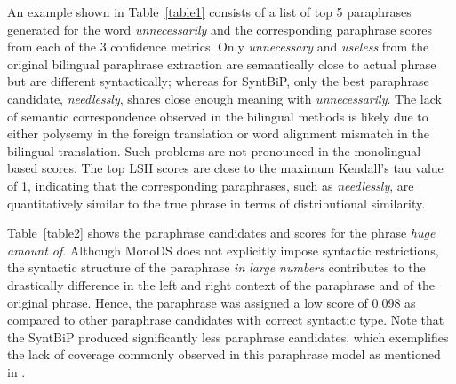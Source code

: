 \documentclass[11pt]{article}
\begin{document}
An example shown in Table~\ref{table1} consists of a list of top 5 paraphrases generated for the word  {\em unnecessarily} and the corresponding paraphrase scores from each of the 3 confidence metrics. Only {\em unnecessary} and {\em useless} from the original bilingual paraphrase extraction are semantically close to actual phrase but are different syntactically; whereas for SyntBiP, only the best paraphrase candidate, {\em needlessly}, shares close enough meaning with {\em unnecessarily}. 
The lack of semantic correspondence observed in the bilingual methods is likely due to either polysemy in the foreign translation or word alignment mismatch in the bilingual translation. Such problems are not pronounced in the monolingual-based scores. The top LSH scores are close to the maximum Kendall's tau value of 1, indicating that the corresponding paraphrases, such as {\em needlessly}, are quantitatively similar to the true phrase in terms of distributional similarity.


Table~\ref{table2} shows the paraphrase candidates and scores for the phrase {\em huge amount of}. Although MonoDS does not explicitly impose syntactic restrictions, the syntactic structure of the paraphrase {\em in large numbers} contributes to the drastically difference in the left and right context of the paraphrase and of the original phrase. Hence, the paraphrase was assigned a low score of 0.098 as compared to other paraphrase candidates with correct syntactic type. Note that the SyntBiP produced significantly less paraphrase candidates, which exemplifies the lack of coverage commonly observed in this paraphrase model as mentioned in . %
\end{document}
